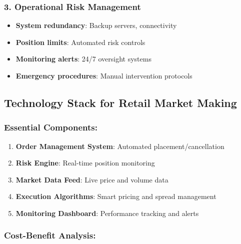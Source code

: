 \hypertarget{operational-risk-management}{%
\subsubsection{\texorpdfstring{3. \textbf{Operational Risk
Management}}{3. Operational Risk Management}}\label{operational-risk-management}}

\begin{itemize}
\tightlist
\item
  \textbf{System redundancy}: Backup servers, connectivity
\item
  \textbf{Position limits}: Automated risk controls
\item
  \textbf{Monitoring alerts}: 24/7 oversight systems
\item
  \textbf{Emergency procedures}: Manual intervention protocols
\end{itemize}

\hypertarget{technology-stack-for-retail-market-making}{%
\subsection{Technology Stack for Retail Market
Making}\label{technology-stack-for-retail-market-making}}

\hypertarget{essential-components}{%
\subsubsection{Essential Components:}\label{essential-components}}

\begin{enumerate}
\def\labelenumi{\arabic{enumi}.}
\tightlist
\item
  \textbf{Order Management System}: Automated placement/cancellation
\item
  \textbf{Risk Engine}: Real-time position monitoring
\item
  \textbf{Market Data Feed}: Live price and volume data
\item
  \textbf{Execution Algorithms}: Smart pricing and spread management
\item
  \textbf{Monitoring Dashboard}: Performance tracking and alerts
\end{enumerate}

\hypertarget{cost-benefit-analysis}{%
\subsubsection{Cost-Benefit Analysis:}\label{cost-benefit-analysis}}

